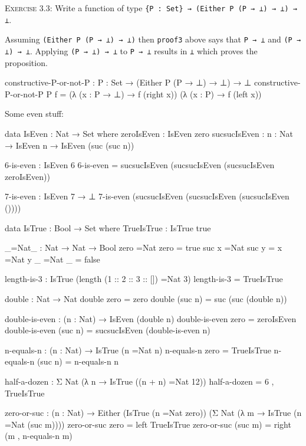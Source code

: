 \documentclass{article}
\begin{document}
\noindent
\textsc{Exercise 3.3}: Write a function of type \verb!{P : Set} → (Either P (P → ⊥) → ⊥) → ⊥!.

Assuming \verb!(Either P (P → ⊥) → ⊥)! then \texttt{proof3} above says that \verb!P → ⊥! and \verb!(P → ⊥) → ⊥!. Applying \verb!(P → ⊥) → ⊥! to \verb!P → ⊥! results in \verb!⊥! which proves the proposition.

\begin{code}
constructive-P-or-not-P : {P : Set} → (Either P (P → ⊥) → ⊥) → ⊥
constructive-P-or-not-P {P} f =
    (λ (x : P → ⊥) → f (right x)) (λ (x : P) → f (left x))
\end{code}

\noindent Some even stuff:

\begin{code}
data IsEven : Nat → Set where
    zeroIsEven : IsEven zero
    sucsucIsEven : {n : Nat} → IsEven n → IsEven (suc (suc n))

6-is-even : IsEven 6
6-is-even = sucsucIsEven (sucsucIsEven (sucsucIsEven zeroIsEven))

7-is-even : IsEven 7 → ⊥
7-is-even (sucsucIsEven (sucsucIsEven (sucsucIsEven ())))

data IsTrue : Bool → Set where
    TrueIsTrue : IsTrue true

_=Nat_ : Nat → Nat → Bool
zero =Nat zero = true
suc x =Nat suc y = x =Nat y
_ =Nat _ = false

length-is-3 : IsTrue (length (1 :: 2 :: 3 :: []) =Nat 3)
length-is-3 = TrueIsTrue
\end{code}

\begin{code}
double : Nat → Nat
double zero = zero
double (suc n) = suc (suc (double n))

double-is-even : (n : Nat) → IsEven (double n)
double-is-even zero = zeroIsEven
double-is-even (suc n) = sucsucIsEven (double-is-even n)
\end{code}

\begin{code}
n-equals-n : (n : Nat) → IsTrue (n =Nat n)
n-equals-n zero = TrueIsTrue
n-equals-n (suc n) = n-equals-n n

half-a-dozen : Σ Nat (λ n → IsTrue ((n + n) =Nat 12))
half-a-dozen = 6 , TrueIsTrue

zero-or-suc : (n : Nat) → Either
    (IsTrue (n =Nat zero))
    (Σ Nat (λ m → IsTrue (n =Nat (suc m))))
zero-or-suc zero = left TrueIsTrue
zero-or-suc (suc m) = right (m , n-equals-n m)
\end{code}
\end{document}
